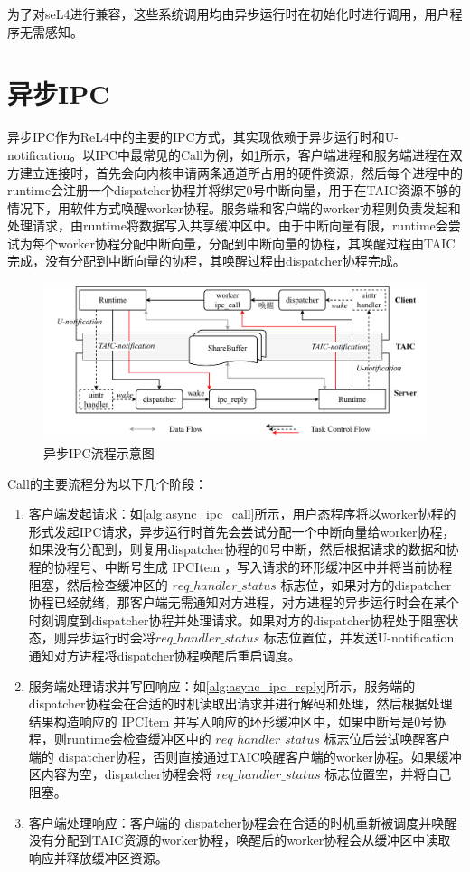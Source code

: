 为了对seL4进行兼容，这些系统调用均由异步运行时在初始化时进行调用，用户程序无需感知。

\section{异步IPC}

异步IPC作为ReL4中的主要的IPC方式，其实现依赖于异步运行时和U-notification。以IPC中最常见的Call为例，如\ref{fig:async_ipc}所示，客户端进程和服务端进程在双方建立连接时，首先会向内核申请两条通道所占用的硬件资源，然后每个进程中的runtime会注册一个dispatcher协程并将绑定0号中断向量，用于在TAIC资源不够的情况下，用软件方式唤醒worker协程。服务端和客户端的worker协程则负责发起和处理请求，由runtime将数据写入共享缓冲区中。由于中断向量有限，runtime会尝试为每个worker协程分配中断向量，分配到中断向量的协程，其唤醒过程由TAIC完成，没有分配到中断向量的协程，其唤醒过程由dispatcher协程完成。

\begin{figure}[htbp]
    \centering
    \includegraphics[width=1.0\textwidth]{figures/async_ipc.drawio.pdf}
    \caption{异步IPC流程示意图}\label{fig:async_ipc}
  \end{figure}

Call的主要流程分为以下几个阶段：
\begin{enumerate}
    \item 客户端发起请求：如\ref{alg:async_ipc_call}所示，用户态程序将以worker协程的形式发起IPC请求，异步运行时首先会尝试分配一个中断向量给worker协程，如果没有分配到，则复用dispatcher协程的0号中断，然后根据请求的数据和协程的协程号、中断号生成 IPCItem ，写入请求的环形缓冲区中并将当前协程阻塞，然后检查缓冲区的 $req\_handler\_status$ 标志位，如果对方的dispatcher协程已经就绪，那客户端无需通知对方进程，对方进程的异步运行时会在某个时刻调度到dispatcher协程并处理请求。如果对方的dispatcher协程处于阻塞状态，则异步运行时会将$req\_handler\_status$ 标志位置位，并发送U-notification通知对方进程将dispatcher协程唤醒后重启调度。
    \item 服务端处理请求并写回响应：如\ref{alg:async_ipc_reply}所示，服务端的dispatcher协程会在合适的时机读取出请求并进行解码和处理，然后根据处理结果构造响应的 IPCItem 并写入响应的环形缓冲区中，如果中断号是0号协程，则runtime会检查缓冲区中的 $req\_handler\_status$  标志位后尝试唤醒客户端的 dispatcher协程，否则直接通过TAIC唤醒客户端的worker协程。如果缓冲区内容为空，dispatcher协程会将 $req\_handler\_status$  标志位置空，并将自己阻塞。
    \item 客户端处理响应：客户端的 dispatcher协程会在合适的时机重新被调度并唤醒没有分配到TAIC资源的worker协程，唤醒后的worker协程会从缓冲区中读取响应并释放缓冲区资源。
\end{enumerate}

